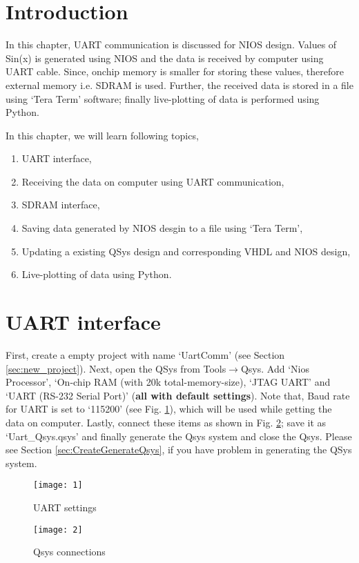 \section{Introduction}
In this chapter, UART communication is discussed for NIOS design. Values of Sin(x) is generated using NIOS and the data is  received by computer using UART cable. Since, onchip memory is smaller for storing these values, therefore external memory i.e. SDRAM is used. Further, the received data is stored in a file using `Tera Term' software; finally live-plotting of data is performed using Python.  

In this chapter, we will learn following topics, 
\begin{enumerate}
	\item UART interface,
	\item Receiving the data on computer using UART communication,
	\item SDRAM interface,
	\item Saving data generated by NIOS desgin to a file using `Tera Term',
	\item Updating a existing QSys design and corresponding VHDL and NIOS design,
	\item Live-plotting of data using Python. 
\end{enumerate}

\section{UART interface}
First, create a empty project with name `UartComm' (see Section \ref{sec:new_project}). Next, open the QSys from Tools$\rightarrow$Qsys. Add `Nios Processor', `On-chip RAM (with 20k total-memory-size), `JTAG UART' and `UART (RS-232 Serial Port)' (\textbf{all with default settings}). Note that, Baud rate for UART is set to `115200' (see Fig. \ref{fig:uart_settings}), which will be used while getting the data on computer. Lastly, connect these items as shown in Fig. \ref{fig:uart_qsys_conn}; save it as `Uart\_Qsys.qsys' and finally generate the Qsys system and close the Qsys. Please see Section \ref{sec:CreateGenerateQsys}, if you have problem in generating the QSys system.

\begin{figure}[!h]
	\centering
	\texttt{[image: 1]}
	\caption{UART settings}
	\label{fig:uart_settings}
\end{figure}
 
\begin{figure}[!h]
	\centering
	\texttt{[image: 2]}
	\caption{Qsys connections}
	\label{fig:uart_qsys_conn}
\end{figure}

